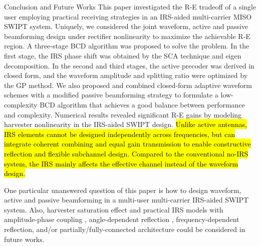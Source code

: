 \documentclass[journal,12pt,onecolumn,draftclsnofoot]{IEEEtran}
\begin{document}
	\begin{section}{Conclusion and Future Works}\label{se:conclusion_and_future_works}
		This paper investigated the R-E tradeoff of a single user employing practical receiving strategies in an IRS-aided multi-carrier MISO SWIPT system. Uniquely, we considered the joint waveform, active and passive beamforming design under rectifier nonlinearity to maximize the achievable R-E region. A three-stage BCD algorithm was proposed to solve the problem. In the first stage, the IRS phase shift was obtained by the SCA technique and eigen decomposition. In the second and third stages, the active precoder was derived in closed form, and the waveform amplitude and splitting ratio were optimized by the GP method. We also proposed and combined closed-form adaptive waveform schemes with a modified passive beamforming strategy to formulate a low-complexity BCD algorithm that achieves a good balance between performance and complexity. Numerical results revealed significant R-E gains by modeling harvester nonlinearity in the IRS-aided SWIPT design. \hl{Unlike active antennas, IRS elements cannot be designed independently across frequencies, but can integrate coherent combining and equal gain transmission to enable constructive reflection and flexible subchannel design. Compared to the conventional no-IRS system, the IRS mainly affects the effective channel instead of the waveform design.}

        One particular unanswered question of this paper is how to design waveform, active and passive beamforming in a multi-user multi-carrier IRS-aided SWIPT system. Also, harvester saturation effect and practical IRS models with amplitude-phase coupling \cite{Abeywickrama2020}, angle-dependent reflection \cite{Tang2021}, frequency-dependent reflection, and/or partially/fully-connected architecture \cite{Shen2020a} could be considered in future works.
	\end{section}
\end{document}

